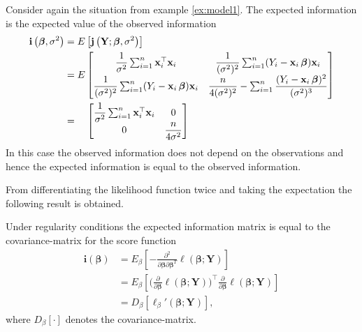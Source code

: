 \begin{example}
Consider again the situation from example \ref{ex:model1}. The expected information is the expected value of the observed information
    \begin{align}\label{eq:expected_informtion_beta}
        \textbf{i}\left(\boldsymbol{\beta}, \sigma^2 \right) &= E\left[\textbf{j}\left( \textbf{Y}; \boldsymbol{\beta}, \sigma^2 \right)\right]\nonumber \\
        &= E \begin{bmatrix}
            \dfrac{1}{\sigma^2} \sum_{i=1}^n \textbf{x}_i^\top \textbf{x}_i & \dfrac{1}{(\sigma^2)^2} \sum_{i=1}^n (Y_i - \textbf{x}_i \operatorname{\boldsymbol{\beta}}) \textbf{x}_i \nonumber \\
            \dfrac{1}{(\sigma^2)^2} \sum_{i=1}^n (Y_i - \textbf{x}_i \operatorname{\boldsymbol{\beta}}) \textbf{x}_i & \dfrac{n}{4 (\sigma^2)^2} - \sum_{i=1}^n \dfrac{(Y_i - \textbf{x}_i \operatorname{\boldsymbol{\beta}})^2}{(\sigma^2)^3}
         \end{bmatrix} \\
         &= \quad 
         \begin{bmatrix}
            \dfrac{1}{\sigma^2} \sum_{i=1}^n \textbf{x}_i^\top \textbf{x}_i & 0  \\
            0 & \dfrac{n}{4 \sigma^2}
         \end{bmatrix}
    \end{align}
    In this case the observed information does not depend on the observations and hence the expected information is equal to the observed information.
\end{example}

From differentiating the likelihood function twice and taking the expectation the following result is obtained.

\begin{lemma}
\label{lem:fisher_information_matrix}
Under regularity conditions the expected information matrix is equal to the covariance-matrix for the score function
\begin{align*}
    \textbf{i}(\boldsymbol{\beta}) &= E_{\beta}\left[- \frac{\partial^2}{\partial \boldsymbol{\beta} \partial \boldsymbol{\beta}^T} \ell(\boldsymbol{\beta}; \textbf{Y})\right] \\
    &= E_{\beta}\left[ \bigg( \frac{\partial}{\partial \boldsymbol{\beta}}\ell(\boldsymbol{\beta};\textbf{Y}) \bigg)^\top \frac{\partial}{\partial \boldsymbol{\beta}}\ell(\boldsymbol{\beta};\textbf{Y})\right] \\
    &= D_{\beta} [\ell_\beta ' (\boldsymbol{\beta}; \textbf{Y})],
\end{align*}
where $D_\beta[\cdot]$ denotes the covariance-matrix. 
\end{lemma}

